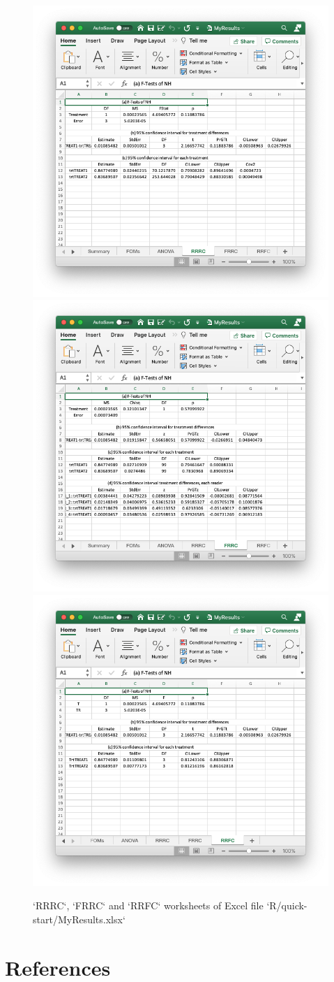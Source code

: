 \documentclass[
]{book}
\begin{document}
\begin{figure}

{\centering \includegraphics[width=0.5\linewidth,height=0.2\textheight]{R/quick-start/MyResultsRRRC} \includegraphics[width=0.5\linewidth,height=0.2\textheight]{R/quick-start/MyResultsFRRC} \includegraphics[width=0.5\linewidth,height=0.2\textheight]{R/quick-start/MyResultsRRFC} 

}

\caption{`RRRC`, `FRRC` and `RRFC` worksheets of Excel file `R/quick-start/MyResults.xlsx`}\label{fig:quick-start-or-xlsx3}
\end{figure}

\hypertarget{quick-start-or-excel-references}{%
\section{References}\label{quick-start-or-excel-references}}
\end{document}
